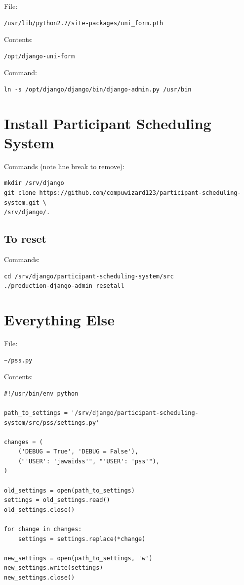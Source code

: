 \documentclass{article}
\begin{document}
File:
\begin{verbatim}
/usr/lib/python2.7/site-packages/uni_form.pth
\end{verbatim}

Contents:
\begin{verbatim}
/opt/django-uni-form
\end{verbatim}

Command:
\begin{verbatim}
ln -s /opt/django/django/bin/django-admin.py /usr/bin
\end{verbatim}

\section{Install Participant Scheduling System}

Commands (note line break to remove):
\begin{verbatim}
mkdir /srv/django
git clone https://github.com/compuwizard123/participant-scheduling-system.git \
/srv/django/.
\end{verbatim}

\subsection{To reset}

Commands:
\begin{verbatim}
cd /srv/django/participant-scheduling-system/src
./production-django-admin resetall
\end{verbatim}

\section{Everything Else}

File:
\begin{verbatim}
~/pss.py
\end{verbatim}

Contents:
\begin{verbatim}
#!/usr/bin/env python

path_to_settings = '/srv/django/participant-scheduling-system/src/pss/settings.py'

changes = (
    ('DEBUG = True', 'DEBUG = False'),
    ("'USER': 'jawaidss'", "'USER': 'pss'"),
)

old_settings = open(path_to_settings)
settings = old_settings.read()
old_settings.close()

for change in changes:
    settings = settings.replace(*change)

new_settings = open(path_to_settings, 'w')
new_settings.write(settings)
new_settings.close()
\end{verbatim}
\end{document}
